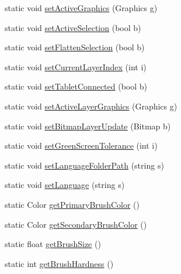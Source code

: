 \begin{DoxyCompactItemize}
\item 
static void \mbox{\hyperlink{class_paint___program_1_1_shared_settings_ac94b1cd45584c31ed985bda4fcbe6f23}{set\+Active\+Graphics}} (Graphics g)
\item 
static void \mbox{\hyperlink{class_paint___program_1_1_shared_settings_a43c59d6960072e3a39f4da2b454a5100}{set\+Active\+Selection}} (bool b)
\item 
static void \mbox{\hyperlink{class_paint___program_1_1_shared_settings_a03cc54bc0ed005f63e902e54013a7492}{set\+Flatten\+Selection}} (bool b)
\item 
static void \mbox{\hyperlink{class_paint___program_1_1_shared_settings_a9c11da21ee314c0fae0b0b6590296ac9}{set\+Current\+Layer\+Index}} (int i)
\item 
static void \mbox{\hyperlink{class_paint___program_1_1_shared_settings_a959f115d7bfe038d4c41cfe6b7f0505f}{set\+Tablet\+Connected}} (bool b)
\item 
static void \mbox{\hyperlink{class_paint___program_1_1_shared_settings_a80ab152c6cd8bc0f28fc2133e2f75498}{set\+Active\+Layer\+Graphics}} (Graphics g)
\item 
static void \mbox{\hyperlink{class_paint___program_1_1_shared_settings_ac2c6e43ce0323e541042873770ed6bdb}{set\+Bitmap\+Layer\+Update}} (Bitmap b)
\item 
static void \mbox{\hyperlink{class_paint___program_1_1_shared_settings_aff4c4b76510f22d152ad10dfa7f1c1b4}{set\+Green\+Screen\+Tolerance}} (int i)
\item 
static void \mbox{\hyperlink{class_paint___program_1_1_shared_settings_abe22a83d0a85c2b1d8fbebd023f0527b}{set\+Language\+Folder\+Path}} (string s)
\item 
static void \mbox{\hyperlink{class_paint___program_1_1_shared_settings_acae1226228e72368d250553176fd9bb9}{set\+Language}} (string s)
\item 
static Color \mbox{\hyperlink{class_paint___program_1_1_shared_settings_a58a36d726e506cdcac3a40bc129bd51f}{get\+Primary\+Brush\+Color}} ()
\item 
static Color \mbox{\hyperlink{class_paint___program_1_1_shared_settings_a66d94c833204a46f2191111e2869e31a}{get\+Secondary\+Brush\+Color}} ()
\item 
static float \mbox{\hyperlink{class_paint___program_1_1_shared_settings_acba0cc3870eb4dbd11a24f7375bcc1f2}{get\+Brush\+Size}} ()
\item 
static int \mbox{\hyperlink{class_paint___program_1_1_shared_settings_a32119345cfca4ee301f1b2de480da3a1}{get\+Brush\+Hardness}} ()

\end{DoxyCompactItemize}
